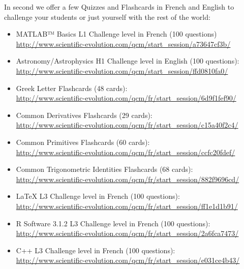 	 In second we offer a few Quizzes and Flashcards in French and English to challenge your students or just yourself with the rest of the world:
	 \begin{itemize}
		\item MATLAB™ Basics L1 Challenge level in French (100 questions)\\ \url{http://www.scientific-evolution.com/qcm/start_session/a73647cf3b/}
		
		\item Astronomy/Astrophysics H1 Challenge level in English (100 questions):\\ \url{http://www.scientific-evolution.com/qcm/start_session/ffd0810fa0/}
		
		\item Greek Letter Flashcards (48 cards):\\
		\url{http://www.scientific-evolution.com/qcm/fr/start_session/6d9f1fef90/}
		
		\item Common Derivatives Flashcards (29 cards):\\
		\url{http://www.scientific-evolution.com/qcm/fr/start_session/c15a40f2c4/}
		
		\item Common Primitives Flashcards (60 cards):\\
		\url{http://www.scientific-evolution.com/qcm/fr/start_session/ccfc20fdef/}
		
		\item Common Trigonometric Identities Flashcards (68 cards):\\
		\url{http://www.scientific-evolution.com/qcm/fr/start_session/882f9696cd/}
		
		\item \LaTeX{} L3 Challenge level in French (100 questions):\\ \url{http://www.scientific-evolution.com/qcm/fr/start_session/ff1e1d1b91/}
		
		\item R Software 3.1.2 L3 Challenge level in French (100 questions):\\ \url{http://www.scientific-evolution.com/qcm/fr/start_session/2a6fca7473/}
		
		\item C++ L3 Challenge level in French (100 questions):\\
		\url{http://www.scientific-evolution.com/qcm/fr/start_session/e031ce4b43/}
	\end{itemize}
	
